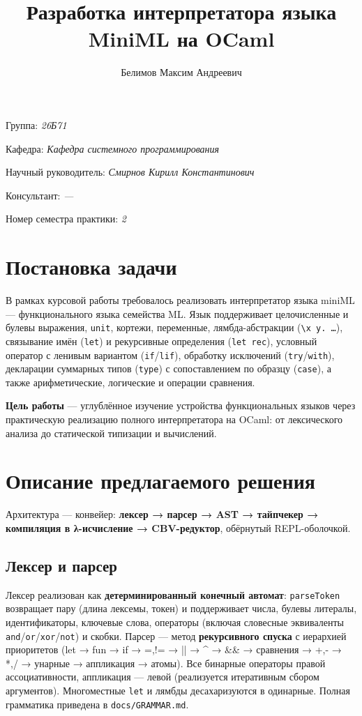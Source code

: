 \documentclass[a4paper]{article}
\title{Разработка интерпретатора языка MiniML на OCaml}
\author{Белимов Максим Андреевич}
\date{}
\begin{document}
\maketitle

\begin{flushright}
    Группа: \emph{26Б71}

    Кафедра: \emph{Кафедра системного программирования}

    Научный руководитель: \emph{Смирнов Кирилл Константинович}
    
    Консультант: \emph{---}
    
    Номер семестра практики: \emph{2}
\end{flushright}

\section{Постановка задачи}

В рамках курсовой работы требовалось реализовать интерпретатор языка miniML — функционального языка семейства ML. Язык поддерживает целочисленные и булевы выражения, \texttt{unit}, кортежи, переменные, лямбда-абстракции (\texttt{\textbackslash x y. \ldots}), связывание имён (\texttt{let}) и рекурсивные определения (\texttt{let rec}), условный оператор с ленивым вариантом (\texttt{if}/\texttt{lif}), обработку исключений (\texttt{try}/\texttt{with}), декларации суммарных типов (\texttt{type}) с сопоставлением по образцу (\texttt{case}), а также арифметические, логические и операции сравнения.

\textbf{Цель работы} — углублённое изучение устройства функциональных языков через практическую реализацию полного интерпретатора на OCaml: от лексического анализа до статической типизации и вычислений.

\section{Описание предлагаемого решения}

Архитектура — конвейер: \textbf{лексер → парсер → AST → тайпчекер → компиляция в λ-исчисление → CBV-редуктор}, обёрнутый REPL-оболочкой.

\subsection{Лексер и парсер}

Лексер реализован как \textbf{детерминированный конечный автомат}: \texttt{parseToken} возвращает пару (длина лексемы, токен) и поддерживает числа, булевы литералы, идентификаторы, ключевые слова, операторы (включая словесные эквиваленты \texttt{and}/\texttt{or}/\texttt{xor}/\texttt{not}) и скобки. Парсер — метод \textbf{рекурсивного спуска} с иерархией приоритетов (let → fun → if → =,!= → || → \^{} → \&\& → сравнения → +,- → *,/ → унарные → аппликация → атомы). Все бинарные операторы правой ассоциативности, аппликация — левой (реализуется итеративным сбором аргументов). Многоместные \texttt{let} и лямбды десахаризуются в одинарные. Полная грамматика приведена в \texttt{docs/GRAMMAR.md}.
\end{document}
